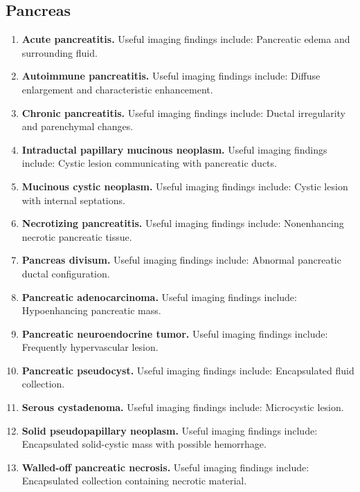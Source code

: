 \subsection{Pancreas}
\begin{enumerate}[leftmargin=*,itemsep=0.45em,topsep=0.4em]
\item \textbf{Acute pancreatitis.} Useful imaging findings include: Pancreatic edema and surrounding fluid.
\item \textbf{Autoimmune pancreatitis.} Useful imaging findings include: Diffuse enlargement and characteristic enhancement.
\item \textbf{Chronic pancreatitis.} Useful imaging findings include: Ductal irregularity and parenchymal changes.
\item \textbf{Intraductal papillary mucinous neoplasm.} Useful imaging findings include: Cystic lesion communicating with pancreatic ducts.
\item \textbf{Mucinous cystic neoplasm.} Useful imaging findings include: Cystic lesion with internal septations.
\item \textbf{Necrotizing pancreatitis.} Useful imaging findings include: Nonenhancing necrotic pancreatic tissue.
\item \textbf{Pancreas divisum.} Useful imaging findings include: Abnormal pancreatic ductal configuration.
\item \textbf{Pancreatic adenocarcinoma.} Useful imaging findings include: Hypoenhancing pancreatic mass.
\item \textbf{Pancreatic neuroendocrine tumor.} Useful imaging findings include: Frequently hypervascular lesion.
\item \textbf{Pancreatic pseudocyst.} Useful imaging findings include: Encapsulated fluid collection.
\item \textbf{Serous cystadenoma.} Useful imaging findings include: Microcystic lesion.
\item \textbf{Solid pseudopapillary neoplasm.} Useful imaging findings include: Encapsulated solid-cystic mass with possible hemorrhage.
\item \textbf{Walled-off pancreatic necrosis.} Useful imaging findings include: Encapsulated collection containing necrotic material.
\end{enumerate}

